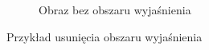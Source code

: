 \begin{figure}[h]
\begin{subfigure}[b]{0.45\textwidth}
		\caption{Obraz bez obszaru wyjaśnienia}
	\end{subfigure}
	\caption{Przykład usunięcia obszaru wyjaśnienia}
	\label{rys:example_no_exp}
\end{figure}

